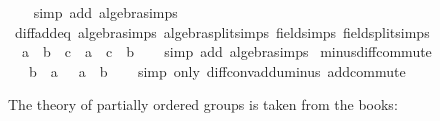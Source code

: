 \begin{isabellebody}
%
\isadelimproof
\ \ %
\endisadelimproof
%
\isatagproof
{}\isamarkupfalse%
\ {\isacharparenleft}{\kern0pt}simp\ add{\isacharcolon}{\kern0pt}\ algebra{\isacharunderscore}{\kern0pt}simps{\isacharparenright}{\kern0pt}%
\endisatagproof
{\isafoldproof}%
%
\isadelimproof
\isanewline
%
\endisadelimproof
\isanewline
{}\isamarkupfalse%
\ diff{\isacharunderscore}{\kern0pt}add{\isacharunderscore}{\kern0pt}eq\ {\isacharbrackleft}{\kern0pt}algebra{\isacharunderscore}{\kern0pt}simps{\isacharcomma}{\kern0pt}\ algebra{\isacharunderscore}{\kern0pt}split{\isacharunderscore}{\kern0pt}simps{\isacharcomma}{\kern0pt}\ field{\isacharunderscore}{\kern0pt}simps{\isacharcomma}{\kern0pt}\ field{\isacharunderscore}{\kern0pt}split{\isacharunderscore}{\kern0pt}simps{\isacharbrackright}{\kern0pt}{\isacharcolon}{\kern0pt}\isanewline
\ \ {\isachardoublequoteopen}{\isacharparenleft}{\kern0pt}a\ {\isacharminus}{\kern0pt}\ b{\isacharparenright}{\kern0pt}\ {\isacharplus}{\kern0pt}\ c\ {\isacharequal}{\kern0pt}\ {\isacharparenleft}{\kern0pt}a\ {\isacharplus}{\kern0pt}\ c{\isacharparenright}{\kern0pt}\ {\isacharminus}{\kern0pt}\ b{\isachardoublequoteclose}\isanewline
%
\isadelimproof
\ \ %
\endisadelimproof
%
\isatagproof
{}\isamarkupfalse%
\ {\isacharparenleft}{\kern0pt}simp\ add{\isacharcolon}{\kern0pt}\ algebra{\isacharunderscore}{\kern0pt}simps{\isacharparenright}{\kern0pt}%
\endisatagproof
{\isafoldproof}%
%
\isadelimproof
\isanewline
%
\endisadelimproof
\isanewline
{}\isamarkupfalse%
\ minus{\isacharunderscore}{\kern0pt}diff{\isacharunderscore}{\kern0pt}commute{\isacharcolon}{\kern0pt}\isanewline
\ \ {\isachardoublequoteopen}{\isacharminus}{\kern0pt}\ b\ {\isacharminus}{\kern0pt}\ a\ {\isacharequal}{\kern0pt}\ {\isacharminus}{\kern0pt}\ a\ {\isacharminus}{\kern0pt}\ b{\isachardoublequoteclose}\isanewline
%
\isadelimproof
\ \ %
\endisadelimproof
%
\isatagproof
{}\isamarkupfalse%
\ {\isacharparenleft}{\kern0pt}simp\ only{\isacharcolon}{\kern0pt}\ diff{\isacharunderscore}{\kern0pt}conv{\isacharunderscore}{\kern0pt}add{\isacharunderscore}{\kern0pt}uminus\ add{\isachardot}{\kern0pt}commute{\isacharparenright}{\kern0pt}%
\endisatagproof
{\isafoldproof}%
%
\isadelimproof
\isanewline
%
\endisadelimproof
\isanewline
{}\isamarkupfalse%
%
\isadelimdocument
%
\endisadelimdocument
%
\isatagdocument
%
\isamarkuptrue%
%
\endisatagdocument
{\isafolddocument}%
%
\isadelimdocument
%
\endisadelimdocument
%
\begin{isamarkuptext}%
The theory of partially ordered groups is taken from the books:


\end{isamarkuptext}
\end{isabellebody}

